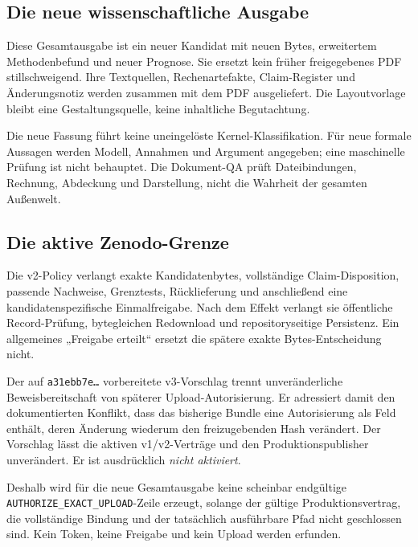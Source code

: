 \begin{cols}
\subsection*{Die neue wissenschaftliche Ausgabe}
Diese Gesamtausgabe ist ein neuer Kandidat mit neuen Bytes, erweitertem Methodenbefund und neuer Prognose. Sie ersetzt kein früher freigegebenes PDF stillschweigend. Ihre Textquellen, Rechenartefakte, Claim-Register und Änderungsnotiz werden zusammen mit dem PDF ausgeliefert. Die Layoutvorlage bleibt eine Gestaltungsquelle, keine inhaltliche Begutachtung.

Die neue Fassung führt keine uneingelöste Kernel-Klassifikation. Für neue formale Aussagen werden Modell, Annahmen und Argument angegeben; eine maschinelle Prüfung ist nicht behauptet. Die Dokument-QA prüft Dateibindungen, Rechnung, Abdeckung und Darstellung, nicht die Wahrheit der gesamten Außenwelt.

\subsection*{Die aktive Zenodo-Grenze}
Die v2-Policy verlangt exakte Kandidatenbytes, vollständige Claim-Disposition, passende Nachweise, Grenztests, Rücklieferung und anschließend eine kandidatenspezifische Einmalfreigabe. Nach dem Effekt verlangt sie öffentliche Record-Prüfung, bytegleichen Redownload und repositoryseitige Persistenz. Ein allgemeines „Freigabe erteilt“ ersetzt die spätere exakte Bytes-Entscheidung nicht. 

Der auf \texttt{a31ebb7e…} vorbereitete v3-Vorschlag trennt unveränderliche Beweisbereitschaft von späterer Upload-Autorisierung. Er adressiert damit den dokumentierten Konflikt, dass das bisherige Bundle eine Autorisierung als Feld enthält, deren Änderung wiederum den freizugebenden Hash verändert. Der Vorschlag lässt die aktiven v1/v2-Verträge und den Produktionspublisher unverändert. Er ist ausdrücklich \emph{nicht aktiviert}. 

Deshalb wird für die neue Gesamtausgabe keine scheinbar endgültige \texttt{AUTHORIZE\_EXACT\_UPLOAD}-Zeile erzeugt, solange der gültige Produktionsvertrag, die vollständige Bindung und der tatsächlich ausführbare Pfad nicht geschlossen sind. Kein Token, keine Freigabe und kein Upload werden erfunden.


\end{cols}
